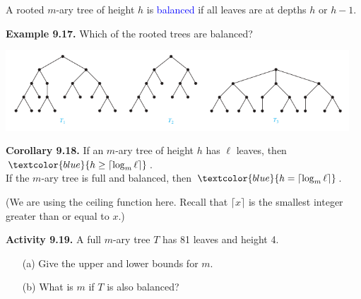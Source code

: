 \documentclass[aspectratio=169]{beamer}
\providecommand{\Blue}[1]{\textcolor{blue}{#1}}
\begin{document}
\begin{frame}[plain]{}

A rooted $m$-ary tree of height $h$ is \Blue{balanced} if all leaves are at depths $h$ or $h-1$.

\medskip

{\bf Example 9.17.} Which of the rooted trees are balanced?
\begin{center}
        \includegraphics[height=3cm]{./img/lecture9-fig11.png}
      \end{center}
\pause

{\bf Corollary 9.18.} If an $m$-ary tree of height $h$ has $\ell$ leaves, then
 $\Blue{h \geq \lceil\log_m\ell\rceil}$.\\ 
 If the $m$-ary tree is full and balanced, then 
 $\Blue{h = \lceil\log_m\ell\rceil}$.
\smallskip

{\small (We are using the ceiling function here. Recall that $\lceil x \rceil$
 is the smallest integer greater than or equal to $x$.)}
 
\end{frame}


\begin{frame}[plain]{}


{\bf Activity 9.19.} A full $m$-ary tree $T$ has 81 leaves and height 4.
    \begin{itemize}
     \item[(a)] Give the upper and lower bounds for $m$.
     \item[(b)] What is $m$ if $T$ is also balanced?
    \end{itemize}
 
\vspace{1.5in} 
 
\end{frame}
\end{document}
